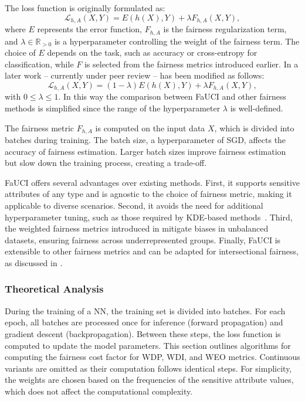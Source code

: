 %
The loss function is originally formulated as:
%
\begin{equation}
    \label{eq:fauci_loss}
    \mathcal{L}_{h,A}(X, Y) = E(h(X), Y) + \lambda F_{h,A}(X, Y),
\end{equation}
%
where \(E\) represents the error function, \(F_{h,A}\) is the fairness regularization term, and \(\lambda \in \mathbb{R}_{>0}\) is a hyperparameter controlling the weight of the fairness term.
%
The choice of \(E\) depends on the task, such as accuracy or cross-entropy for classification, while \(F\) is selected from the fairness metrics introduced earlier.
%
In a later work -- currently under peer review --  has been modified as follows:
%
\begin{equation}
    \label{eq:fauci_loss_new}
    \mathcal{L}_{h,A}(X, Y) = (1 - \lambda) E(h(X), Y) + \lambda F_{h,A}(X, Y),
\end{equation}
%
with $0 \le \lambda \le 1$.
%
In this way the comparison between \gls{FaUCI} and other fairness methods is simplified since the range of the hyperparameter \(\lambda\) is well-defined.

%
The fairness metric \(F_{h,A}\) is computed on the input data \(X\), which is divided into batches during training.
%
The batch size, a hyperparameter of \gls{SGD}, affects the accuracy of fairness estimation.
%
Larger batch sizes improve fairness estimation but slow down the training process, creating a trade-off.

%
\gls{FaUCI} offers several advantages over existing methods.
%
First, it supports sensitive attributes of any type and is agnostic to the choice of fairness metric, making it applicable to diverse scenarios.
%
Second, it avoids the need for additional hyperparameter tuning, such as those required by \gls{KDE}-based methods~\cite{DBLP:conf/nips/ChoHS20}.
%
Third, the weighted fairness metrics introduced in  mitigate biases in unbalanced datasets, ensuring fairness across underrepresented groups.
%
Finally, \gls{FaUCI} is extensible to other fairness metrics and can be adapted for intersectional fairness, as discussed in .



\subsubsection{Theoretical Analysis}
\label{subsubsec:theoretical}
%
During the training of a \gls{NN}, the training set is divided into batches.
%
For each epoch, all batches are processed once for inference (forward propagation) and gradient descent (backpropagation).
%
Between these steps, the loss function is computed to update the model parameters.
%
This section outlines algorithms for computing the fairness cost factor for \gls{WDP}, \gls{WDI}, and \gls{WEO} metrics.
%
Continuous variants are omitted as their computation follows identical steps.
%
For simplicity, the weights are chosen based on the frequencies of the sensitive attribute values, which does not affect the computational complexity.

